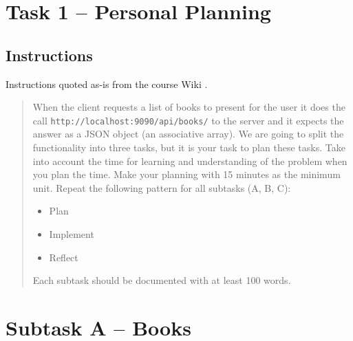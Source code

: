 %
%
%
%


\section{Task 1 -- Personal Planning}

\subsection{Instructions}\label{task-1-instructions}
Instructions quoted as-is from the course Wiki \cite{1dv600:lab1:instructions}.

\begin{quote}
  When the client requests a list of books to present for the user it does the
  call \texttt{http://localhost:9090/api/books/} to the server and it expects
  the answer as a JSON object (an associative array). We are going to split the
  functionality into three tasks, but it is your task to plan these tasks. Take
  into account the time for learning and understanding of the problem when you
  plan the time. Make your planning with 15 minutes as the minimum unit. Repeat
  the following pattern for all subtasks (A, B, C):
  
  \begin{itemize}
    \tightlist
    \item Plan
    \item Implement
    \item Reflect
  \end{itemize}
  
  Each subtask should be documented with at least 100 words.
\end{quote}


\section{Subtask A -- Books}\label{task-1a}
